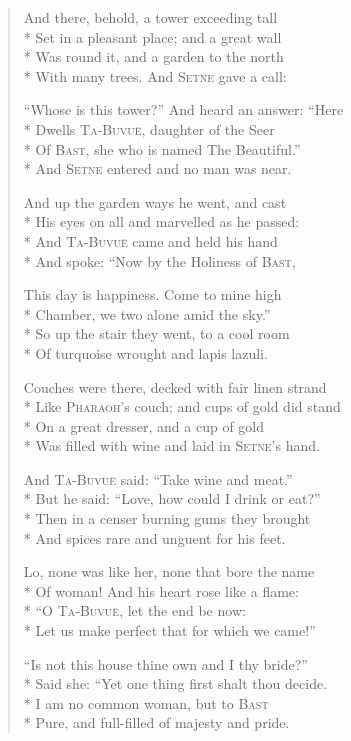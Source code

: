 \documentclass[12pt]{article}
\newcommand{\vin}{\hspace{1em}}
\begin{document}
\begin{verse}
And there, behold, a tower exceeding tall\\*
Set in a pleasant place; and a great wall\\*
\vin Was round it, and a garden to the north\\*
With many trees. And \textsc{Setne} gave a call:

``Whose is this tower?'' And heard an answer: ``Here\\*
Dwells \textsc{Ta-Buvu\"{e}}, daughter of the Seer\\*
\vin Of \textsc{Bast}, she who is named The Beautiful.''\\*
And \textsc{Setne} entered and no man was near.

And up the garden ways he went, and cast\\*
His eyes on all and marvelled as he passed:\\*
\vin And \textsc{Ta-Buvu\"{e}} came and held his hand\\*
And spoke: ``Now by the Holiness of \textsc{Bast},

This day is happiness. Come to mine high\\*
Chamber, we two alone amid the sky.''\\*
\vin So up the stair they went, to a cool room\\*
Of turquoise wrought and lapis lazuli.

Couches were there, decked with fair linen strand\\*
Like \textsc{Pharaoh}'s couch; and cups of gold did stand\\*
\vin On a great dresser, and a cup of gold\\*
Was filled with wine and laid in \textsc{Setne}'s hand.

And \textsc{Ta-Buvu\"{e}} said: ``Take wine and meat.''\\*
But he said: ``Love, how could I drink or eat?''\\*
\vin Then in a censer burning gums they brought\\*
And spices rare and unguent for his feet.

Lo, none was like her, none that bore the name\\*
Of woman! And his heart rose like a flame:\\*
\vin ``O \textsc{Ta-Buvu\"{e}}, let the end be now:\\*
Let us make perfect that for which we came!''

``Is not this house thine own and I thy bride?''\\*
Said she: ``Yet one thing first shalt thou decide.\\*
\vin I am no common woman, but to \textsc{Bast}\\*
Pure, and full-filled of majesty and pride.


\end{verse}
\end{document}
